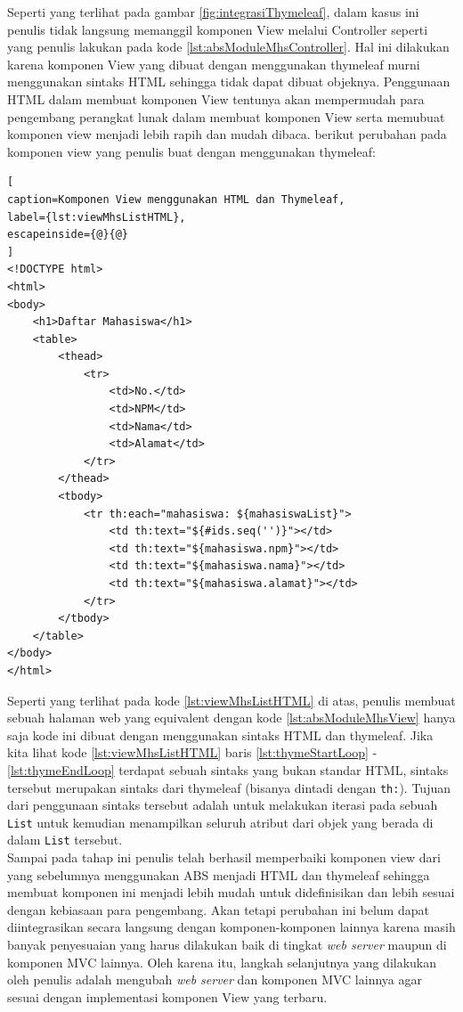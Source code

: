 Seperti yang terlihat pada gambar \ref{fig:integrasiThymeleaf}, dalam kasus ini penulis tidak langsung memanggil komponen View melalui Controller seperti yang penulis lakukan pada kode \ref{lst:absModuleMhsController}. Hal ini dilakukan karena komponen View yang dibuat dengan menggunakan thymeleaf murni menggunakan sintaks HTML sehingga tidak dapat dibuat objeknya. Penggunaan HTML dalam membuat komponen View tentunya akan mempermudah para pengembang perangkat lunak dalam membuat komponen View serta memubuat komponen view menjadi lebih rapih dan mudah dibaca. berikut perubahan pada komponen view yang penulis buat dengan menggunakan thymeleaf:

\begin{lstlisting}[
caption=Komponen View menggunakan HTML dan Thymeleaf,
label={lst:viewMhsListHTML},
escapeinside={@}{@}
]
<!DOCTYPE html>
<html>
<body>
	<h1>Daftar Mahasiswa</h1>
	<table>
		<thead>
			<tr>
				<td>No.</td>
				<td>NPM</td>
				<td>Nama</td>
				<td>Alamat</td>
			</tr>
		</thead>
		<tbody>
			<tr th:each="mahasiswa: ${mahasiswaList}">
				<td th:text="${#ids.seq('')}"></td>
				<td th:text="${mahasiswa.npm}"></td>
				<td th:text="${mahasiswa.nama}"></td>
				<td th:text="${mahasiswa.alamat}"></td>
			</tr>
		</tbody>
	</table>
</body>
</html>
\end{lstlisting}

Seperti yang terlihat pada kode \ref{lst:viewMhsListHTML} di atas, penulis membuat sebuah halaman web yang equivalent dengan kode \ref{lst:absModuleMhsView} hanya saja kode ini dibuat dengan menggunakan sintaks HTML dan thymeleaf. Jika kita lihat kode \ref{lst:viewMhsListHTML} baris \ref{lst:thymeStartLoop} - \ref{lst:thymeEndLoop} terdapat sebuah sintaks yang bukan standar HTML, sintaks tersebut merupakan sintaks dari thymeleaf (bisanya dintadi dengan \texttt{th:}). Tujuan dari penggunaan sintaks tersebut adalah untuk melakukan iterasi pada sebuah \texttt{List} untuk kemudian menampilkan seluruh atribut dari objek yang berada di dalam \texttt{List} tersebut.\\

Sampai pada tahap ini penulis telah berhasil memperbaiki komponen view dari yang sebelumnya menggunakan ABS menjadi HTML dan thymeleaf sehingga membuat komponen ini menjadi lebih mudah untuk didefinisikan dan lebih sesuai dengan kebiasaan para pengembang. Akan tetapi perubahan ini belum dapat diintegrasikan secara langsung dengan komponen-komponen lainnya karena masih banyak penyesuaian yang harus dilakukan baik di tingkat \textit{web server} maupun di komponen MVC lainnya. Oleh karena itu, langkah selanjutnya yang dilakukan oleh penulis adalah mengubah \textit{web server} dan komponen MVC lainnya agar sesuai dengan implementasi komponen View yang terbaru.

